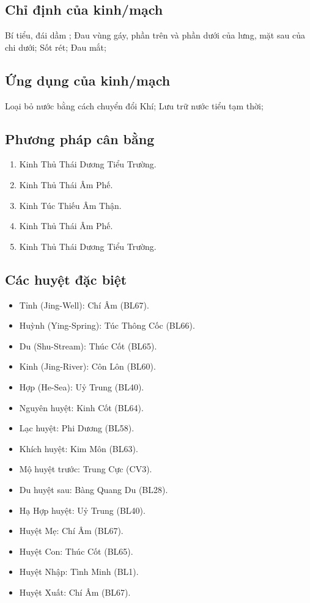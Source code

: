 \documentclass[12pt,a4paper]{article}
\begin{document}
\subsection*{Chỉ định của kinh/mạch}Bí tiểu, đái dầm ; Đau vùng gáy, phần trên và phần dưới của lưng, mặt sau của chi dưới; Sốt rét; Đau mắt;
\subsection*{Ứng dụng của kinh/mạch}Loại bỏ nước bằng cách chuyển đổi Khí; Lưu trữ nước tiểu tạm thời;
\subsection*{Phương pháp cân bằng}
\begin{enumerate}
\item Kinh Thủ Thái Dương Tiểu Trường.
\item Kinh Thủ Thái Âm Phế.
\item Kinh Túc Thiếu Âm Thận.
\item Kinh Thủ Thái Âm Phế.
\item Kinh Thủ Thái Dương Tiểu Trường.
\end{enumerate}
\subsection*{Các huyệt đặc biệt}
\begin{itemize}
\item Tỉnh (Jing-Well): Chí Âm (BL67).
\item Huỳnh (Ying-Spring): Túc Thông Cốc (BL66).
\item Du (Shu-Stream): Thúc Cốt (BL65).
\item Kinh (Jing-River): Côn Lôn (BL60).
\item Hợp (He-Sea): Uỷ Trung (BL40).
\item Nguyên huyệt: Kinh Cốt (BL64).
\item Lạc huyệt: Phi Dương (BL58).
\item Khích huyệt: Kim Môn (BL63).
\item Mộ huyệt trước: Trung Cực (CV3).
\item Du huyệt sau: Bàng Quang Du (BL28).
\item Hạ Hợp huyệt: Uỷ Trung (BL40).
\item Huyệt Mẹ: Chí Âm (BL67).
\item Huyệt Con: Thúc Cốt (BL65).
\item Huyệt Nhập: Tình Minh (BL1).
\item Huyệt Xuất: Chí Âm (BL67).
\end{itemize}
\end{document}
